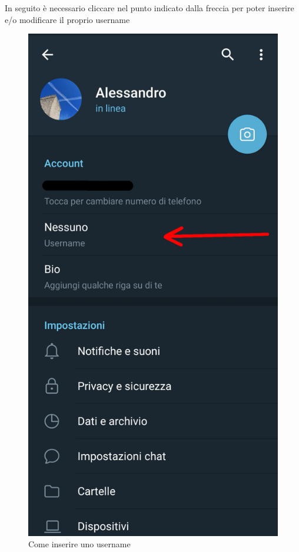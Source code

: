 		\newpage
		In seguito è necessario cliccare nel punto indicato dalla freccia per poter inserire e/o modificare il proprio username
		\begin{figure}[H]
			\centering
			\includegraphics[scale=0.100]{res/images/telegram2.jpg}
			\caption{Come inserire uno username}
			\label{Screenshot2}
		\end{figure}
